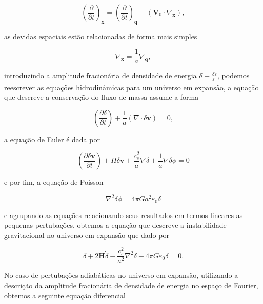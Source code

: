 \begin{equation}\label{eq25}
	\left(\dfrac{\partial}{\partial t}\right)_\mathbf{x} = \left( \dfrac{\partial}{\partial t} \right)_\mathbf{q} - (\mathbf{V}_0 \cdot \nabla_\mathbf{x}),
\end{equation}
 
as devidas espaciais estão relacionadas de forma mais simples

\begin{equation}\label{eq26}
	\nabla_\mathbf{x} = \dfrac{1}{a}\nabla_\mathbf{q},
\end{equation}

 introduzindo a amplitude fracionária de densidade de energia $ \delta \equiv \frac{\delta\varepsilon}{\varepsilon_0} $, podemos reescrever as equações hidrodinâmicas para um universo em expansão, a equação que descreve a conservação do fluxo de massa assume a forma 
 
 \begin{equation}\label{eq27}
 	\left( \dfrac{\partial \delta}{\partial t} \right) + \dfrac{1}{a}(\nabla\cdot\delta\mathbf{v}) = 0,
 \end{equation}
 
a equação de Euler é dada por

\begin{equation}\label{eq28}
	\left( \dfrac{\partial \delta\mathbf{v}}{\partial t} \right) +H\delta\mathbf{v}+\dfrac{c^2_s}{a}\nabla\delta + \dfrac{1}{a}\nabla\delta\phi =0
\end{equation}

e por fim, a equação de Poisson

\begin{equation}\label{eq29}
	\nabla^2\delta\phi = 4\pi Ga^2\varepsilon_0\delta
\end{equation}
 
e agrupando as equações relacionando seus resultados em termos lineares as pequenas pertubações, obtemos a equação que descreve a instabilidade gravitacional no universo em expansão que dado por
 
\begin{equation}\label{eq30}
 	\ddot{\delta} + 2\mathbf{H}\dot{\delta} - \dfrac{c^2_s}{a^2}\nabla^2\delta - 4\pi G\varepsilon_0\delta = 0.
\end{equation}

No caso de pertubações adiabáticas no universo em expansão, utilizando a descrição da amplitude fracionária de densidade de energia no espaço de Fourier, obtemos a seguinte equação diferencial 

